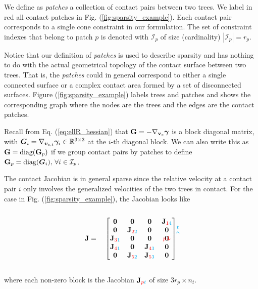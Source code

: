We define as \textit{patches} a collection of contact pairs between two
trees. We label in red all contact patches in Fig. (\ref{fig:sparsity_example}).
Each contact pair corresponds to a single cone constraint in our
formulation. The set of constraint indexes that belong to patch $p$ is
denoted with $\mathcal{I}_p$ of size (cardinality) $|\mathcal{I}_p| = r_p$.

Notice that our definition of \textit{patches} is used to describe sparsity and
has nothing to do with the actual geometrical topology of the contact surface
between two trees. That is, the \textit{patches} could in
general correspond to either a single connected surface or a complex contact area
formed by a set of disconnected surfaces. Figure (\ref{fig:sparsity_example})
labels trees and patches and shows the corresponding graph where the nodes are
the trees and the edges are the contact patches.

Recall from Eq. (\ref{eq:ellR_hessian}) that ${\mathbf{G}} =
-\nabla_{{\mathbf{v}}_c}{\bm\gamma}$ is a block diagonal matrix, with ${\bm{G}}_i =
\nabla_{{\bm{v}}_{c,i}}{\bm\gamma}_i \in \mathbb{R}^{3\times 3}$ at the $i\text{-th}$
diagonal block. We can also write this as ${\mathbf{G}} = \text{diag}({\mathbf{G}}_p)$ if we
group contact pairs by patches to define ${\mathbf{G}}_p=\text{diag}({\bm{G}}_i),
\,\forall i\in\mathcal{I}_p$.

The contact Jacobian is in general sparse since the relative velocity at a
contact pair $i$ only involves the generalized velocities of the two trees
in contact. For the case in Fig. (\ref{fig:sparsity_example}), the Jacobian looks
like\\\\
\begin{equation}
	\mf{J}=\quad
	\begin{bmatrix}
		\tikzmark{J_topleft}\mf{0} & 
		\mf{0} & \mf{0} & \mf{J}_{\rr{1}\cc{4}}\tikzmark{J_topright}\\		
		\mf{0} & \mf{J}_{\rr{2}\cc{2}} & \mf{0} & \mf{0}\\
		\mf{J}_{\rr{3}\cc{1}} & \mf{0} & \mf{0} & \mf{0}\\
		\mf{J}_{\rr{4}\cc{1}} & \mf{0} & \mf{J}_{\rr{4}\cc{3}} & \mf{0}\\
		\tikzmark{J_bottomleft}
		\mf{0} & \mf{J}_{\rr{5}\cc{2}} & \mf{J}_{\rr{5}\cc{3}} & \mf{0}		
	\end{bmatrix}
\tikz[overlay,remember picture] {
	\draw[->,thick,color=cyan]
  ([yshift=3ex]J_topleft) -- ([yshift=3ex]J_topright) node[midway,above]
  {\scriptsize $t$}; 
  \draw[->,thick,color=red]
  ([yshift=1.5ex,xshift=-3ex]J_topleft) -- ([xshift=-3ex]J_bottomleft)
  node[near end,left] {\scriptsize $p$};}	
\end{equation}
\\
where each non-zero block is the Jacobian ${\mathbf{J}}_{{\color{red}p}{\color{cyan}t}}$ of size
$3r_p\times n_t$.

